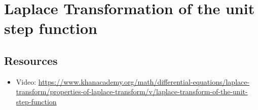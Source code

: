 %
%
%
%
%




\newpage
\section{Laplace Transformation of the unit step function}

\subsection*{Resources}
\begin{itemize}
    \item Video: \url{https://www.khanacademy.org/math/differential-equations/laplace-transform/properties-of-laplace-transform/v/laplace-transform-of-the-unit-step-function} %
\end{itemize}

